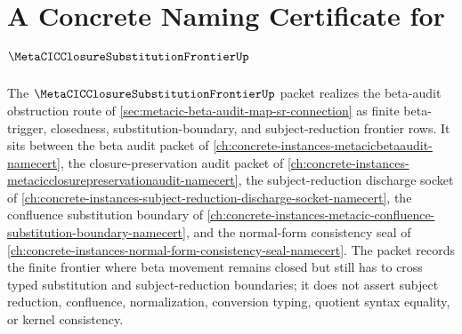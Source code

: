 \chapter{A Concrete Naming Certificate for $\MetaCICClosureSubstitutionFrontierUp$}
\label{ch:concrete-instances-metacic-closure-substitution-frontier-namecert}

The $\MetaCICClosureSubstitutionFrontierUp$ packet realizes the beta-audit obstruction route of \autoref{sec:metacic-beta-audit-map-sr-connection} as finite beta-trigger, closedness, substitution-boundary, and subject-reduction frontier rows. It sits between the beta audit packet of \autoref{ch:concrete-instances-metacicbetaaudit-namecert}, the closure-preservation audit packet of \autoref{ch:concrete-instances-metacicclosurepreservationaudit-namecert}, the subject-reduction discharge socket of \autoref{ch:concrete-instances-subject-reduction-discharge-socket-namecert}, the confluence substitution boundary of \autoref{ch:concrete-instances-metacic-confluence-substitution-boundary-namecert}, and the normal-form consistency seal of \autoref{ch:concrete-instances-normal-form-consistency-seal-namecert}. The packet records the finite frontier where beta movement remains closed but still has to cross typed substitution and subject-reduction boundaries; it does not assert subject reduction, confluence, normalization, conversion typing, quotient syntax equality, or kernel consistency.

